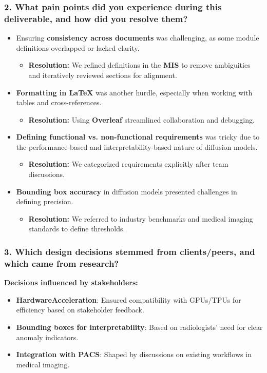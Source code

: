 \documentclass[12pt, titlepage]{article}
\begin{document}
\subsubsection{2. What pain points did you experience during this deliverable, and how did you resolve them?}
\begin{itemize}
    \item Ensuring \textbf{consistency across documents} was challenging, as some module definitions overlapped or lacked clarity.
    \begin{itemize}
        \item \textbf{Resolution:} We refined definitions in the \textbf{MIS} to remove ambiguities and iteratively reviewed sections for alignment.
    \end{itemize}
    \item \textbf{Formatting in LaTeX} was another hurdle, especially when working with tables and cross-references.
    \begin{itemize}
        \item \textbf{Resolution:} Using \textbf{Overleaf} streamlined collaboration and debugging.
    \end{itemize}
    \item \textbf{Defining functional vs. non-functional requirements} was tricky due to the performance-based and interpretability-based nature of diffusion models.
    \begin{itemize}
        \item \textbf{Resolution:} We categorized requirements explicitly after team discussions.
    \end{itemize}
    \item \textbf{Bounding box accuracy} in diffusion models presented challenges in defining precision.
    \begin{itemize}
        \item \textbf{Resolution:} We referred to industry benchmarks and medical imaging standards to define thresholds.
    \end{itemize}
\end{itemize}

\subsubsection{3. Which design decisions stemmed from clients/peers, and which came from research?}

\textbf{Decisions influenced by stakeholders:}
\begin{itemize}
    \item \textbf{HardwareAcceleration}: Ensured compatibility with GPUs/TPUs for efficiency based on stakeholder feedback.
    \item \textbf{Bounding boxes for interpretability}: Based on radiologists’ need for clear anomaly indicators.
    \item \textbf{Integration with PACS}: Shaped by discussions on existing workflows in medical imaging.
\end{itemize}
\end{document}
